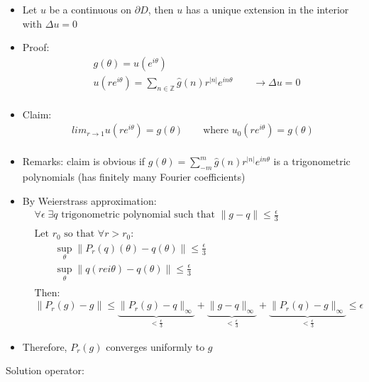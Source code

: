 \documentclass[12pt, a4paper]{article}
\begin{document}
\begin{itemize}
    \item Let $u$ be a continuous on $\partial D$, then  $u$ has a unique extension in the interior with $\Delta u = 0$
    \item Proof:
    \begin{align*}
        &g(\theta) = u(e^{i\theta})\\
        &u(re^{i\theta}) = \sum_{n\in\mathbb{Z}}\hat{g}(n)r^{|n|}e^{in\theta} \qquad \rightarrow \Delta u = 0\\
    \end{align*}
    \item Claim:
    \begin{align*}
        lim_{r\to 1}u(re^{i\theta}) = g(\theta) \qquad \text{where }u_0(re^{i\theta}) = g(\theta)\\
    \end{align*}
    \item Remarks: claim is obvious if $g(\theta) = \sum_{-m}^m\hat{g}(n)r^{|n|}e^{in\theta}$ is a trigonometric polynomials (has finitely many Fourier coefficients)
    \item By Weierstrass approximation:
    \begin{align*}
        &\forall \epsilon \;\exists q \text{ trigonometric polynomial such that } \|g-q\| \leq \frac{\epsilon}{3}\\\\
        &\text{Let $r_0$ so that }\forall r > r_0:\\
        &\qquad\sup_\theta \|P_r(q)(\theta) - q(\theta)\|\leq \frac{\epsilon}{3}\\
        &\qquad\sup_\theta \|q(re{i\theta}) - q(\theta)\|\leq \frac{\epsilon}{3}\\\\
        &\text{Then:}\\
        &\|P_r(g)-g\| \leq \underbrace{\|P_r(g) - q\|_\infty}_{< \frac{\epsilon}{3}}+\underbrace{\|g - q\|_\infty}_{< \frac{\epsilon}{3}}+\underbrace{\|P_r(q) - g\|_\infty}_{< \frac{\epsilon}{3}} \leq \epsilon
    \end{align*}
    \item Therefore, $P_r(g)$ converges uniformly to $g$\\
\end{itemize}
Solution operator:
\end{document}
